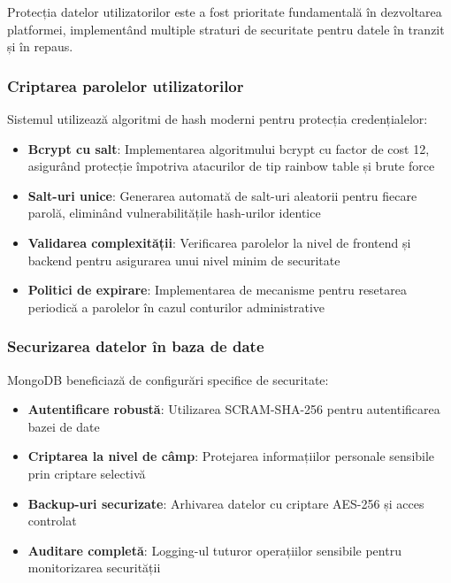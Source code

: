 \documentclass[12pt,a4paper]{report}
\begin{document}
Protecția datelor utilizatorilor este a fost prioritate fundamentală în dezvoltarea platformei, implementând multiple straturi de securitate pentru datele în tranzit și în repaus.

\subsubsection{Criptarea parolelor utilizatorilor}

Sistemul utilizează algoritmi de hash moderni pentru protecția credențialelor:

\begin{itemize}
    \item \textbf{Bcrypt cu salt}: Implementarea algoritmului bcrypt cu factor de cost 12, asigurând protecție împotriva atacurilor de tip rainbow table și brute force
    \item \textbf{Salt-uri unice}: Generarea automată de salt-uri aleatorii pentru fiecare parolă, eliminând vulnerabilitățile hash-urilor identice
    \item \textbf{Validarea complexității}: Verificarea parolelor la nivel de frontend și backend pentru asigurarea unui nivel minim de securitate
    \item \textbf{Politici de expirare}: Implementarea de mecanisme pentru resetarea periodică a parolelor în cazul conturilor administrative
\end{itemize}


\subsubsection{Securizarea datelor în baza de date}

MongoDB beneficiază de configurări specifice de securitate:

\begin{itemize}
    \item \textbf{Autentificare robustă}: Utilizarea SCRAM-SHA-256 pentru autentificarea bazei de date
    \item \textbf{Criptarea la nivel de câmp}: Protejarea informațiilor personale sensibile prin criptare selectivă
    \item \textbf{Backup-uri securizate}: Arhivarea datelor cu criptare AES-256 și acces controlat
    \item \textbf{Auditare completă}: Logging-ul tuturor operațiilor sensibile pentru monitorizarea securității
\end{itemize}
\end{document}
